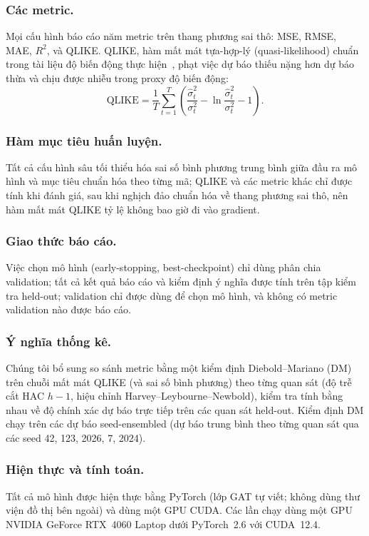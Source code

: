 \documentclass[runningheads]{llncs}
\begin{document}
\subsubsection{Các metric.}
Mọi cấu hình báo cáo năm metric trên thang phương sai thô: MSE, RMSE, MAE, $R^2$, và QLIKE. QLIKE, hàm
mất mát tựa-hợp-lý (quasi-likelihood) chuẩn trong tài liệu độ biến động thực hiện~\cite{patton2011}, phạt
việc dự báo thiếu nặng hơn dự báo thừa và chịu được nhiễu trong proxy độ biến động:
\begin{equation}
\text{QLIKE} = \frac{1}{T}\sum_{t=1}^{T}\left(\frac{\hat{\sigma}^2_t}{\sigma^2_t}
 - \ln\frac{\hat{\sigma}^2_t}{\sigma^2_t} - 1\right).
\label{eq:qlike}
\end{equation}

\subsubsection{Hàm mục tiêu huấn luyện.}
Tất cả cấu hình sâu tối thiểu hóa sai số bình phương trung bình giữa đầu ra mô hình và mục tiêu chuẩn hóa
theo từng mã; QLIKE và các metric khác chỉ được tính khi đánh giá, sau khi nghịch đảo chuẩn hóa về thang
phương sai thô, nên hàm mất mát QLIKE tỷ lệ không bao giờ đi vào gradient.

\subsubsection{Giao thức báo cáo.}
Việc chọn mô hình (early-stopping, best-checkpoint) chỉ dùng phân chia validation; tất cả kết quả báo cáo
và kiểm định ý nghĩa được tính trên tập kiểm tra held-out; validation chỉ được dùng để chọn mô hình, và
không có metric validation nào được báo cáo.

\subsubsection{Ý nghĩa thống kê.}
Chúng tôi bổ sung so sánh metric bằng một kiểm định Diebold--Mariano (DM) trên chuỗi mất mát QLIKE (và
sai số bình phương) theo từng quan sát (độ trễ cắt HAC $h{-}1$, hiệu chỉnh Harvey--Leybourne--Newbold),
kiểm tra tính bằng nhau về độ chính xác dự báo trực tiếp trên các quan sát held-out. Kiểm định DM chạy
trên các dự báo seed-ensembled (dự báo trung bình theo từng quan sát qua các seed 42, 123, 2026, 7, 2024).

\subsubsection{Hiện thực và tính toán.}
Tất cả mô hình được hiện thực bằng PyTorch (lớp GAT tự viết; không dùng thư viện đồ thị bên ngoài) và
dùng một GPU CUDA. Các lần chạy dùng một GPU NVIDIA GeForce RTX~4060 Laptop dưới PyTorch~2.6 với
CUDA~12.4.
\end{document}
